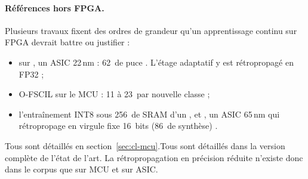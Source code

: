 \paragraph{Références hors FPGA.} Plusieurs travaux fixent des ordres de grandeur qu'un
apprentissage continu sur FPGA devrait battre ou justifier :
\begin{itemize}
  \item {} sur , un ASIC  22\,nm : 62\, de puce
    \citep[§V-D]{arxiv-2110.10486-tinyml-platform-device-continual-learning}. L'étage
    adaptatif y est rétropropagé en FP32 \citep[§III-C]{arxiv-2110.10486-tinyml-platform-device-continual-learning} ;
  \item O-FSCIL sur le MCU  : 11 à 23\, par nouvelle classe
    \citep[Table~IV]{arxiv-2403.07851-12-mj-per-class-device} ;
  \item l'entraînement INT8 sous 256\, de SRAM d'un 
    \citep[§3.2]{arxiv-2206.15472-device-training-256kb-memory}, et , un ASIC 65\,nm
    qui rétropropage en virgule fixe 16~bits (86\, de synthèse)
    \citep[§III-A, §IV-B]{arxiv-2402.09780-tinycl-efficient-hardware-architecture-continual}\pp.
\end{itemize}
\ifcomplete Tous sont détaillés en section~\ref{sec:cl-mcu}.\else Tous sont détaillés dans la version complète de l'état de l'art.\fi{}
La rétropropagation en précision réduite n'existe donc dans le corpus que sur MCU et sur
ASIC.

